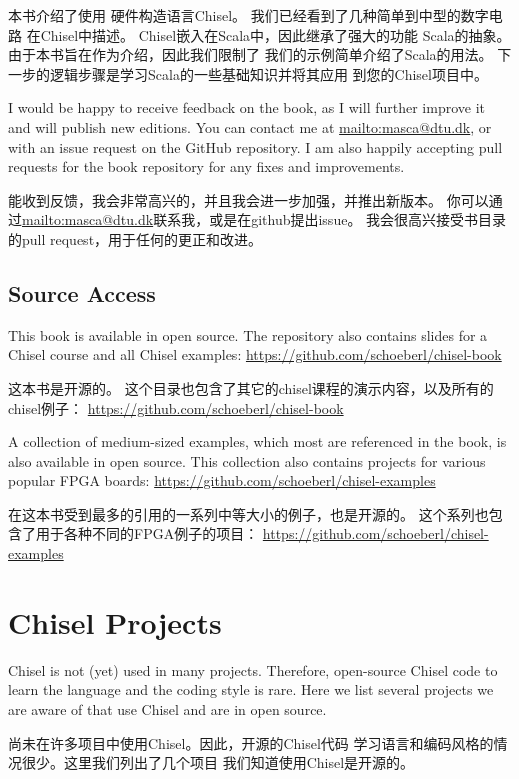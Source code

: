\documentclass[%
    10pt,
    headinclude, footexclude,
    openright, %
    notitlepage,
    cleardoubleempty,
    headsepline,
    pointlessnumbers,
    bibtotoc, idxtotoc,
    ]{scrbook}
\begin{document}
{本书介绍了使用
硬件构造语言Chisel。
我们已经看到了几种简单到中型的数字电路
在Chisel中描述。
Chisel嵌入在Scala中，因此继承了强大的功能
Scala的抽象。
由于本书旨在作为介绍，因此我们限制了
我们的示例简单介绍了Scala的用法。
下一步的逻辑步骤是学习Scala的一些基础知识并将其应用
到您的Chisel项目中。

I would be happy to receive feedback on the book, as I will further
improve it and will publish new editions. You can contact me at
\url{mailto:masca@dtu.dk}, or with an issue request on the GitHub
repository. I am also happily accepting pull requests
for the book repository for any fixes and improvements.

能收到反馈，我会非常高兴的，并且我会进一步加强，并推出新版本。
你可以通过\url{mailto:masca@dtu.dk}联系我，或是在github提出issue。
我会很高兴接受书目录的pull request，用于任何的更正和改进。

\section*{Source Access}

This book is available in open source.
The repository also contains slides for a Chisel course and
all Chisel examples: \url{https://github.com/schoeberl/chisel-book}

这本书是开源的。
这个目录也包含了其它的chisel课程的演示内容，以及所有的chisel例子：
\url{https://github.com/schoeberl/chisel-book}

A collection of medium-sized examples, which most are referenced
in the book, is also available in open source. This collection
also contains projects for various popular FPGA boards:
\url{https://github.com/schoeberl/chisel-examples}

在这本书受到最多的引用的一系列中等大小的例子，也是开源的。
这个系列也包含了用于各种不同的FPGA例子的项目：
\url{https://github.com/schoeberl/chisel-examples}

\appendix

\chapter{Chisel Projects}

Chisel is not (yet) used in many projects. Therefore, open-source Chisel code
to learn the language and the coding style is rare. Here we list several projects
we are aware of that use Chisel and are in open source.

尚未在许多项目中使用Chisel。因此，开源的Chisel代码
学习语言和编码风格的情况很少。这里我们列出了几个项目
我们知道使用Chisel是开源的。

}
\end{document}
